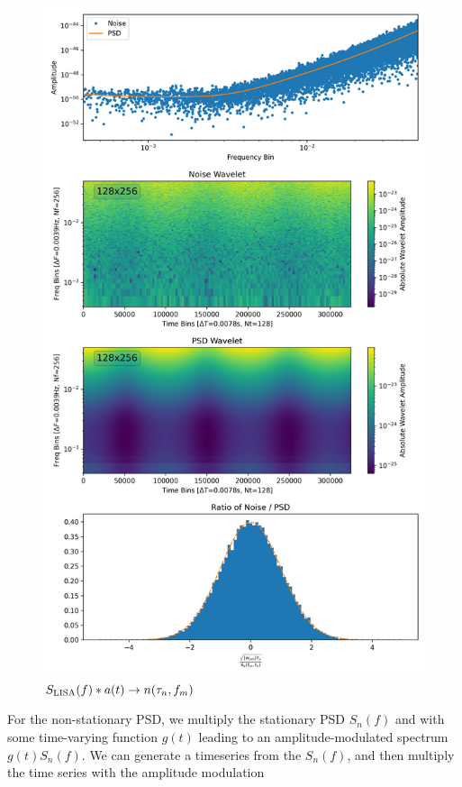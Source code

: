 \documentclass{article}
\begin{document}
\begin{figure}[!tbp]
\begin{minipage}[b]{0.4\textwidth}
    \includegraphics[width=\textwidth]{figures/PSD/lisa_wavelet_modulated_psd.png}
    \caption{$S_{\rm LISA}(f)*a(t)\rightarrow n(\tau_n,f_m)$}
  \end{minipage}
\end{figure}


For the non-stationary PSD, we multiply the stationary PSD $S_n(f)$ and with some time-varying function $g(t)$ leading to an amplitude-modulated spectrum $g(t)S_n(f)$. We can generate a timeseries from the $S_n(f)$, and then multiply the time series with the amplitude modulation ~\cite{nonstationary_psd}
\end{document}
